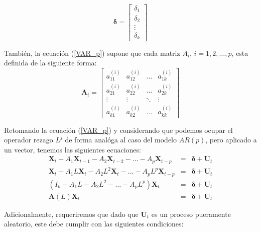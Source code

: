 \documentclass[
  a4paper,
]{article}
\begin{document}
\begin{equation*}
    \mathbf{\delta} = 
    \begin{bmatrix}
    \delta_{1} \\ \delta_{2} \\ \vdots \\ \delta_{k}
    \end{bmatrix}
\end{equation*}

También, la ecuación (\ref{VAR_p}) supone que cada matriz \(A_i\),
\(i = 1, 2, \ldots, p\), esta definida de la siguiente forma:
\begin{equation*}
    \mathbf{A}_i = 
    \begin{bmatrix}
    a^{(i)}_{11} & a^{(i)}_{12} & \ldots & a^{(i)}_{1k} \\ a^{(i)}_{21} & a^{(i)}_{22} & \ldots & a^{(i)}_{2k} \\ \vdots & \vdots & \ddots & \vdots \\ a^{(i)}_{k1} & a^{(i)}_{k2} & \ldots & a^{(i)}_{kk}
    \end{bmatrix}
\end{equation*}

Retomando la ecuación (\ref{VAR_p}) y considerando que podemos ocupar el
operador rezago \(L^j\) de forma analóga al caso del modelo \(AR(p)\),
pero aplicado a un vector, tenemos las siguientes ecuaciones:
\begin{eqnarray}
    \mathbf{X}_t - A_1 \mathbf{X}_{t-1} - A_2 \mathbf{X}_{t-2} - \ldots - A_p \mathbf{X}_{t-p} & = & \mathbf{\delta} + \mathbf{U}_{t} \nonumber \\
    \mathbf{X}_t - A_1 L \mathbf{X}_{t} - A_2 L^2 \mathbf{X}_{t} - \ldots - A_p L^p \mathbf{X}_{t-p} & = & \mathbf{\delta} + \mathbf{U}_{t} \nonumber \\
    (I_k - A_1 L - A_2 L^2 - \ldots - A_p L^p) \mathbf{X}_t & = & \mathbf{\delta} + \mathbf{U}_{t} \nonumber \\
    \mathbf{A}(L) \mathbf{X}_t & = & \mathbf{\delta} + \mathbf{U}_{t}
    \label{VAR_Corto}
\end{eqnarray}

Adicionalmente, requeriremos que dado que \(\mathbf{U}_t\) es un proceso
pueramente aleatorio, este debe cumplir con las siguientes condiciones:
\end{document}
